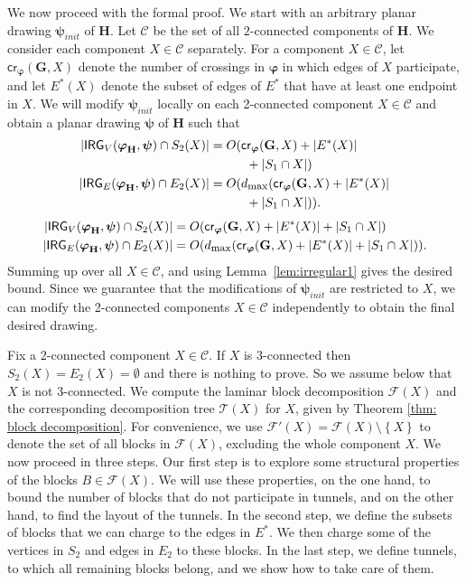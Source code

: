 \documentclass[twoside,leqno,twocolumn]{article}
\newcommand{\set}[1]{\left\{ #1 \right\}}
\newcommand{\tset}{{\mathcal T}}
\newcommand{\cset}{{\mathcal{C}}}
\newcommand{\fset}{{\mathcal{F}}}
\newcommand{\cro}{\mathsf{cr}}
\newcommand{\irreg}{\mathsf{IRG}}
\newcommand{\dmax}{d_{\mbox{\textup{\footnotesize{max}}}}}
\newcommand{\G}{{\mathbf{G}}}
\renewcommand{\H}{{\mathbf{H}}}
\newcommand{\bphi}{{\boldsymbol{\varphi}}}
\newcommand{\bpsi}{{\boldsymbol{\psi}}}
\begin{document}
We now proceed with the formal proof.
We start with an arbitrary planar drawing $\bpsi_{init}$ of $\H$. Let $\cset$ be the set of all $2$-connected components of $\H$. We consider each component $X\in \cset$ separately.
For a component $X\in \cset$,
let $\cro_{\bphi}(\G,X)$ 
denote the number of crossings in $\bphi$ in which edges of $X$ participate, and let $E^*(X)$ denote the subset of edges of $E^*$ that have at least one endpoint in $X$.
We will modify $\bpsi_{init}$ locally on each 2-connected component $X\in \cset$ and obtain a planar
drawing $\bpsi$ of $\H$ such that
\ifabstract
\begin{align*}
|\irreg_V(\bphi_{\H},\bpsi)\cap S_2(X)| &=  O(\cro_{\bphi}(\G,X)+|E^*(X)| \\ &\phantom{{}=O()}+ |S_1 \cap X|)\\
|\irreg_E(\bphi_{\H},\bpsi)\cap E_2(X)| &=  O(\dmax (\cro_{\bphi}(\G,X)+|E^*(X)| \\ &\phantom{{}=O()} + |S_1 \cap X|)).
\end{align*}
\fi \iffull
\begin{align*}
|\irreg_V(\bphi_{\H},\bpsi)\cap S_2(X)| &=  O(\cro_{\bphi}(\G,X)+|E^*(X)| + |S_1 \cap X|)\\
|\irreg_E(\bphi_{\H},\bpsi)\cap E_2(X)| &=  O(\dmax (\cro_{\bphi}(\G,X)+|E^*(X)| + |S_1 \cap X|)).
\end{align*}
\fi Summing up over all $X\in \cset$, and using Lemma~\ref{lem:irregular1} gives the desired bound.
Since we  guarantee that the modifications of $\bpsi_{init}$ are restricted to $X$,
we can modify the 2-connected components $X\in \cset$ independently to obtain 
the final desired drawing.

Fix a 2-connected component $X\in \cset$. If $X$ is 3-connected then 
$S_2(X) = E_2(X) = \emptyset$ and there is nothing to prove. So we assume below that $X$ is not
3-connected. We compute the laminar block decomposition $\fset(X)$ and the corresponding decomposition tree $\tset(X)$ for $X$, given by Theorem \ref{thm: block decomposition}. For convenience, we use $\fset'(X)=\fset(X)\setminus \set{X}$ to denote the set of all blocks in $\fset(X)$, excluding the whole component $X$.
We now proceed in three steps. Our first step is to explore some structural properties of the blocks $B\in \fset(X)$. We will use these properties, on the one hand, to bound the number of blocks that do not participate in tunnels, and on the other hand, to find the layout of the tunnels.
In the second step, we define the subsets of blocks that we can charge to the edges in $E^*$. We then charge some of the vertices in $S_2$ and edges in $E_2$ to these blocks. In the last step, we define tunnels, to which all remaining blocks belong, and we show how to take care of them.
\end{document}
